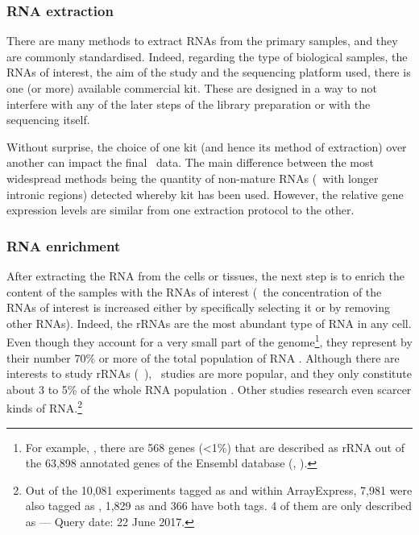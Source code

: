 \subsubsection{\gls{RNA} extraction}

There are many methods to extract \glspl{RNA} from the primary samples, and they
are commonly standardised. Indeed, regarding the type of biological samples,
the \glspl{RNA} of interest, the aim of the  study and the sequencing platform
used, there is one (or more) available commercial kit. These are designed in
a way to not interfere
with any of the later steps of the library preparation or with the sequencing
itself.

Without surprise, the choice of one kit (and hence its method of extraction)
over another can impact the final \Rnaseq\ data. The main difference between
the most widespread methods being the quantity of non-mature \glspl{RNA}
(\ie\ with longer intronic regions) detected whereby kit has been used.
However, the relative gene expression levels are similar from one extraction
protocol to the other. 


\subsubsection{\gls{RNA} enrichment}

After extracting the \gls{RNA} from the cells or tissues,
the next step is to enrich the content of the samples with the \glspl{RNA}
of interest (\ie\ the concentration of the \glspl{RNA} of interest is increased
either by specifically selecting it or by removing other \glspl{RNA}). Indeed,
the \glspl{rRNA} are the most abundant type of \gls{RNA} in any cell. Even
though they account for a very small part of the genome\footnote{For example,
, there are 568 genes (<1\%) that are described as
\gls{rRNA} out of the 63,898 annotated genes of the \gls{Ensembl} database
(, ).}, they represent by their number 70\% or more of
the total population of \gls{RNA} .
Although there are interests to study \glspl{rRNA} (\eg{}~\cite{rrnaStudy}),
\mRNAs\ studies are more popular,
and they only constitute about 3 to 5\% of the whole \gls{RNA} population
. Other studies research even scarcer kinds of
\gls{RNA}.\footnote{Out of the 10,081 experiments tagged as  and  within \gls{ArrayExpress},
7,981 were also tagged as ,
1,829 as  and 366 have both tags.
4 of them are only described as  --- Query date: 22 June 2017.}

